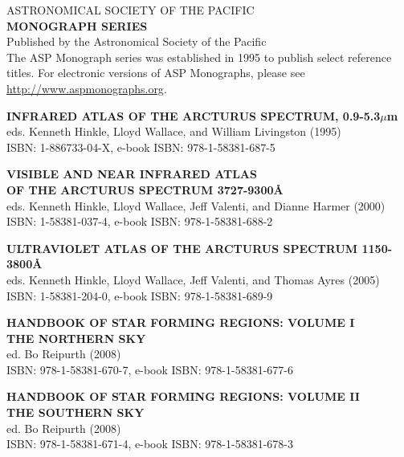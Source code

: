 \begin{center}
{\Large ASTRONOMICAL SOCIETY OF THE PACIFIC}\\
\vspace{5pt}
{\LARGE \bfseries MONOGRAPH SERIES}\\
\vspace{5pt}
{\small Published by the Astronomical Society of the Pacific}\\
\vspace{5pt}
The ASP Monograph series was established in 1995 to publish select
reference titles. For electronic versions of ASP Monographs, please see
\url{http://www.aspmonographs.org}.

\noindent\hrulefill
\vspace{1.0em}

{\bf INFRARED ATLAS OF THE ARCTURUS SPECTRUM, 0.9-5.3$\mu$m}\\
eds. Kenneth Hinkle, Lloyd Wallace, and William Livingston (1995)\\
ISBN: 1-886733-04-X, e-book ISBN: 978-1-58381-687-5

\vspace{5pt}
{\bf VISIBLE AND NEAR INFRARED ATLAS \\ OF THE ARCTURUS SPECTRUM 3727-9300\AA}\\
eds. Kenneth Hinkle, Lloyd Wallace, Jeff Valenti, and Dianne Harmer (2000)\\
ISBN: 1-58381-037-4, e-book ISBN: 978-1-58381-688-2

\vspace{5pt}
{\bf ULTRAVIOLET ATLAS OF THE ARCTURUS SPECTRUM 1150-3800\AA}\\
eds. Kenneth Hinkle, Lloyd Wallace, Jeff Valenti, and Thomas Ayres (2005)\\
ISBN: 1-58381-204-0, e-book ISBN: 978-1-58381-689-9

\vspace{5pt}
{\bf HANDBOOK OF STAR FORMING REGIONS: VOLUME I\\
THE NORTHERN SKY}\\
ed. Bo Reipurth (2008)\\
ISBN: 978-1-58381-670-7, e-book ISBN: 978-1-58381-677-6

\vspace{5pt}
{\bf HANDBOOK OF STAR FORMING REGIONS: VOLUME II\\ 
THE SOUTHERN SKY}\\
ed. Bo Reipurth (2008)\\
ISBN: 978-1-58381-671-4, e-book ISBN: 978-1-58381-678-3


\end{center}
